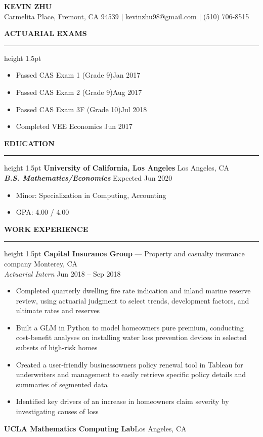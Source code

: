 \documentclass[11pt,letterpaper]{article}
\newcommand{\sectline}{\vspace{4pt}\hrule height 1.5pt\vspace{4pt}}
\newcommand{\sectspace}{\vspace{8pt}}
\newcommand{\smallspace}{\vspace{4pt}}
\begin{document}
\centering
{\fontsize{13pt}{13pt}\selectfont \textbf{KEVIN ZHU}} \vspace{2pt} \\
{\fontsize{12pt}{13pt} Carmelita Place, Fremont, CA 94539 | kevinzhu98@gmail.com | (510) 706-8515}
\sectspace

\fontsize{11pt}{13pt}\selectfont
\raggedright
\textbf{ACTUARIAL EXAMS}\sectline
\begin{itemize}
	\item Passed CAS Exam 1 (Grade 9)\hfill Jan 2017
	\item Passed CAS Exam 2 (Grade 9)\hfill Aug 2017
	\item Passed CAS Exam 3F (Grade 10)\hfill Jul 2018
	\item Completed VEE Economics \hfill Jun 2017
\end{itemize}
\sectspace


\textbf{EDUCATION}\sectline
\textbf{University of California, Los Angeles} \hfill Los Angeles, CA \\
\textbf{\textit{B.S. Mathematics/Economics}} \hfill Expected Jun 2020 
\begin{itemize}
	\item Minor: Specialization in Computing, Accounting
	\item GPA: 4.00 / 4.00
\end{itemize}
\sectspace

\textbf{WORK EXPERIENCE}\sectline
\textbf{Capital Insurance Group} --- Property and casualty insurance company \hfill Monterey, CA \\
\textit{Actuarial Intern} \hfill Jun 2018 -- Sep 2018 
\begin{itemize}
	\item Completed quarterly dwelling fire rate indication and inland marine reserve review, using actuarial judgment to select trends, development factors, and ultimate rates and reserves
	\item Built a GLM in Python to model homeowners pure premium, conducting cost-benefit analyses on installing water loss prevention devices in selected subsets of high-risk homes 
	\item Created a user-friendly businessowners policy renewal tool in Tableau for underwriters and management to easily retrieve specific policy details and summaries of segmented data
	\item Identified key drivers of an increase in homeowners claim severity by investigating causes of loss
\end{itemize}
\smallspace 
\textbf{UCLA Mathematics Computing Lab}\hfill Los Angeles, CA \\
\end{document}
